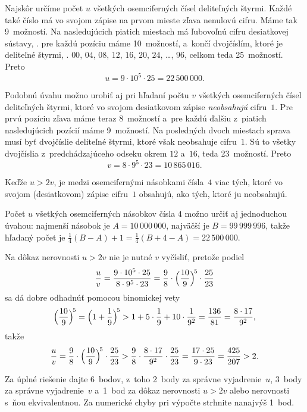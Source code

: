 {%
Najskôr určíme počet $u$ všetkých osemciferných čísel deliteľných štyrmi.
Každé také číslo má vo svojom zápise na prvom mieste zľava nenulovú
cifru. Máme tak 9~možností. Na nasledujúcich piatich miestach má ľubovoľnú cifru
desiatkovej sústavy, \tj. pre každú pozíciu máme 10~možností, a~končí
dvojčíslím, ktoré je deliteľné štyrmi, \tj. $00$, $04$, $08$, $12$, $16$, $20$,
$24$, \dots, $96$, celkom teda 25~možností. Preto
$$
u=9\cdot10^5\cdot25=22\,500\,000.
$$

Podobnú úvahu možno urobiť aj pri hľadaní počtu $v$ všetkých osemciferných čísel
deliteľných štyrmi, ktoré vo svojom desiatkovom zápise {\it neobsahujú\/} cifru~$1$.
Pre prvú pozíciu zľava máme teraz 8~možností a~pre každú ďalšiu z~piatich
nasledujúcich pozícií máme 9~možností. Na posledných dvoch miestach sprava musí
byť dvojčíslie deliteľné štyrmi, ktoré však neobsahuje cifru~$1$. Sú to
všetky dvojčíslia z~predchádzajúceho odseku okrem $12$ a~$16$, teda 23~možností.
Preto
$$
v=8\cdot9^5\cdot23=10\,865\,016.
$$

\zaver
Keďže $u>2v$, je medzi osemcifernými násobkami čísla~$4$ viac
tých, ktoré vo svojom (desiatkovom) zápise cifru~$1$ obsahujú,
ako tých, ktoré ju neobsahujú.

\poznamka
Počet $u$ všetkých osemciferných násobkov čísla $4$
možno určiť aj jednoduchou úvahou: najmenší násobok je $A=10\,000\,000$,
najväčší je $B=99\,999\,996$, takže hľadaný počet je
$\frac14(B-A)+1=\frac14(B+4-A)=22\,500\,000$.

Na dôkaz nerovnosti $u>2v$ nie je nutné $v$ vyčísliť, pretože podiel
$$
\frac uv=\frac{9\cdot 10^5 \cdot 25}{8\cdot 9^5\cdot
23}=\frac98\cdot\Bigl(\frac{10}9\Bigr)^{\!5}\cdot\frac{25}{23}
$$
sa dá dobre odhadnúť pomocou binomickej vety
$$
\Bigl(\frac{10}9\Bigr)^{\!5}=\Bigl(1+\frac{1}9\Bigr)^{\!5}>1+5\cdot\frac19+10\cdot
\frac1{9^2}=
    \frac{136}{81}=\frac{8\cdot17}{9^2},
$$
takže
$$
\frac uv=\frac98\cdot\Bigl(\frac{10}9\Bigr)^{\!5}\cdot\frac{25}{23}>
   \frac98\cdot \frac{8\cdot17}{9^2}\cdot
\frac{25}{23}=\frac{17\cdot25}{9\cdot23}=
   \frac{425}{207}>2.
$$

\nobreak\medskip\petit\noindent
Za úplné riešenie dajte 6~bodov, z~toho 2~body za správne
vyjadrenie~$u$, 3~body za správne vyjadrenie~$v$ a~1~bod za dôkaz nerovnosti
$u>2v$ alebo nerovnosti s~ňou ekvivalentnou. Za
numerické chyby pri výpočte strhnite nanajvýš 1~bod.

\endpetit
\bigbreak
}

